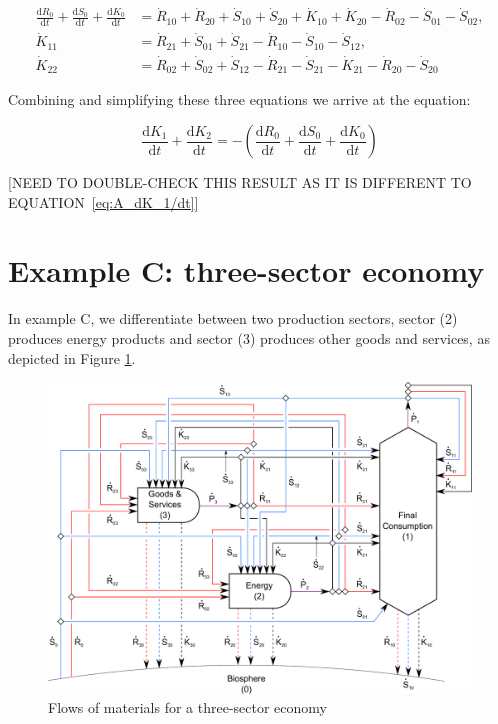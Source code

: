 \begin{align} \label{eq:B_CV_0_to_2_b}
	\frac{\mathrm{d}R_{0}}{\mathrm{d}t} 
	+ \frac{\mathrm{d}S_{0}}{\mathrm{d}t}	
	+ \frac{\mathrm{d}K_0}{\mathrm{d}t}		
	& = \dot{R}_{10} + \dot{R}_{20} 
	+ \dot{S}_{10} + \dot{S}_{20} 
	+ \dot{K}_{10} + \dot{K}_{20} 
	- \dot{R}_{02} 
	- \dot{S}_{01}
	- \dot{S}_{02}, 							\\
	\dot{K}_{11}
	& = \dot{R}_{21} 
	+ \dot{S}_{01} 
	+ \dot{S}_{21}
	- \dot{R}_{10} 
	- \dot{S}_{10}
	- \dot{S}_{12},							\\
	\dot{K}_{22}
	& = \dot{R}_{02} 
	+ \dot{S}_{02} 
	+ \dot{S}_{12} 
	- \dot{R}_{21}
	- \dot{S}_{21}
	- \dot{K}_{21}
	- \dot{R}_{20} 
	- \dot{S}_{20} 
\end{align}

Combining and simplifying these three equations we arrive at the equation:

\begin{equation}\label{eq:B_CV_all}
	\frac{\mathrm{d}K_{1}}{\mathrm{d}t}
	+ \frac{\mathrm{d}K_{2}}{\mathrm{d}t}
	= - \left(\frac{\mathrm{d}R_{0}}{\mathrm{d}t} 
	+ \frac{\mathrm{d}S_{0}}{\mathrm{d}t}	
	+ \frac{\mathrm{d}K_0}{\mathrm{d}t}\right)
\end{equation}

[NEED TO DOUBLE-CHECK THIS RESULT AS IT IS DIFFERENT TO EQUATION~\ref{eq:A_dK_1/dt}]


\section{Example C: three-sector economy} %
\label{sec:C_materials}

In example C, we differentiate between two production sectors, sector (2) produces energy
products and sector (3) produces other goods and services, as depicted in Figure
\ref{fig:C_materials}.

\begin{figure}[!ht]
\centering
\includegraphics[width=0.8\linewidth]{Part_1/Chapter_Materials/images/3_sector_materials.pdf}
\caption[Flows of materials for a three-sector economy]{Flows of materials for a three-sector economy}
\label{fig:C_materials}
\end{figure}

